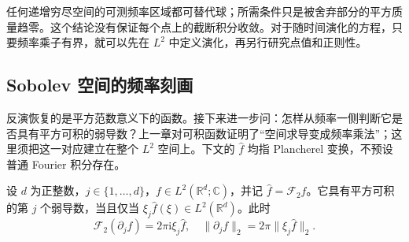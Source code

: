 任何递增穷尽空间的可测频率区域都可替代球；所需条件只是被舍弃部分的平方质量趋零。这个结论没有保证每个点上的截断积分收敛。对于随时间演化的方程，只要频率乘子有界，就可以先在 \(L^2\) 中定义演化，再另行研究点值和正则性。



\subsection{Sobolev 空间的频率刻画}
\label{b2:subsec:040105}

反演恢复的是平方范数意义下的函数。接下来进一步问：怎样从频率一侧判断它是否具有平方可积的弱导数？上一章对可积函数证明了“空间求导变成频率乘法”；这里须把这一对应建立在整个 \(L^2\) 空间上。下文的 \(\widehat f\) 均指 Plancherel 变换，不预设普通 Fourier 积分存在。

\begin{theorem}[平方可积弱导数的频率刻画]\label{b2:thm:04-weak-derivative}
设 \(d\) 为正整数，\(j\in\{1,\ldots,d\}\)，\(f\in L^2(\mathbb R^d;\mathbb C)\)，并记 \(\widehat f=\mathcal F_2f\)。它具有平方可积的第 \(j\) 个弱导数，当且仅当 \(\xi_j\widehat f(\xi)\in L^2(\mathbb R^d)\)。此时
\[
 \mathcal F_2(\partial_jf)=2\pi\mathrm{i}\xi_j\widehat f,
 \quad\|\partial_jf\|_2=2\pi\|\xi_j\widehat f\|_2.
\]
\end{theorem}
